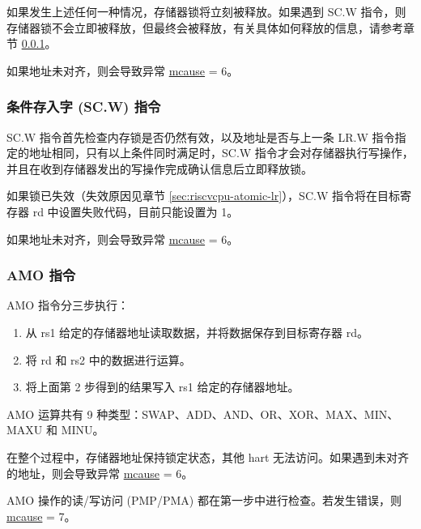 \documentclass[main\_\_CN.tex]{subfiles}
\begin{document}
如果发生上述任何一种情况，存储器锁将立刻被释放。如果遇到 SC.W 指令，则存储器锁不会立即被释放，但最终会被释放，有关具体如何释放的信息，请参考章节 \ref{sec:riscvcpu-atomic-sc}。

如果地址未对齐，则会导致异常 \hyperref[regdesc:MCAUSE]{mcause} = 6。

\subsubsection{条件存入字 (SC.W) 指令}
\label{sec:riscvcpu-atomic-sc}

SC.W 指令首先检查内存锁是否仍然有效，以及地址是否与上一条 LR.W 指令指定的地址相同，只有以上条件同时满足时，SC.W 指令才会对存储器执行写操作，并且在收到存储器发出的写操作完成确认信息后立即释放锁。

如果锁已失效（失效原因见章节 \ref{sec:riscvcpu-atomic-lr}），SC.W 指令将在目标寄存器 rd 中设置失败代码，目前只能设置为 1。

如果地址未对齐，则会导致异常 \hyperref[regdesc:MCAUSE]{mcause} = 6。

\subsubsection{AMO 指令}
\label{sec:riscvcpu-atomic-amo}

AMO 指令分三步执行：

\begin{enumerate}
     \item 从 rs1 给定的存储器地址读取数据，并将数据保存到目标寄存器 rd。
     \item 将 rd 和 rs2 中的数据进行运算。
     \item 将上面第 2 步得到的结果写入 rs1 给定的存储器地址。
\end{enumerate}

AMO 运算共有 9 种类型：SWAP、ADD、AND、OR、XOR、MAX、MIN、MAXU 和 MINU。

在整个过程中，存储器地址保持锁定状态，其他 hart 无法访问。如果遇到未对齐的地址，则会导致异常 \hyperref[regdesc:MCAUSE]{mcause} = 6。

AMO 操作的读/写访问 (PMP/PMA) 都在第一步中进行检查。若发生错误，则 \hyperref[regdesc:MCAUSE]{mcause} = 7。
\end{document}
